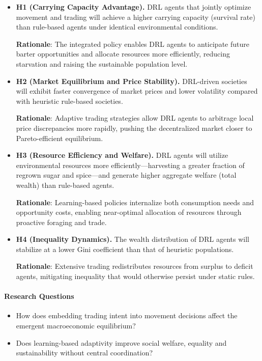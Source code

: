 \documentclass[pdflatex,sn-mathphys-num]{sn-jnl}%
\theoremstyle{thmstyleone}%
\theoremstyle{thmstyletwo}%
\theoremstyle{thmstylethree}%
\begin{document}
\begin{itemize}
\item \textbf{H1 (Carrying Capacity Advantage).} DRL agents that jointly optimize movement and trading will achieve a higher carrying capacity (survival rate) than rule-based agents under identical environmental conditions.

\textbf{Rationale}: The integrated policy enables DRL agents to anticipate future barter opportunities and allocate resources more efficiently, reducing starvation and raising the sustainable population level.

\item \textbf{H2 (Market Equilibrium and Price Stability).} DRL-driven societies will exhibit faster convergence of market prices and lower volatility compared with heuristic rule-based societies.

\textbf{Rationale}: Adaptive trading strategies allow DRL agents to arbitrage local price discrepancies more rapidly, pushing the decentralized market closer to Pareto-efficient equilibrium.

\item \textbf{H3 (Resource Efficiency and Welfare).} DRL agents will utilize environmental resources more efficiently—harvesting a greater fraction of regrown sugar and spice—and generate higher aggregate welfare (total wealth) than rule-based agents.

\textbf{Rationale}: Learning-based policies internalize both consumption needs and opportunity costs, enabling near-optimal allocation of resources through proactive foraging and trade.

\item \textbf{H4 (Inequality Dynamics).} The wealth distribution of DRL agents will stabilize at a lower Gini coefficient than that of heuristic populations.

\textbf{Rationale}: Extensive trading redistributes resources from surplus to deficit agents, mitigating inequality that would otherwise persist under static rules.

\end{itemize}

\paragraph{Research Questions}

\begin{itemize}
    \item[(i)] How does embedding trading intent into movement decisions affect the emergent macroeconomic equilibrium?
    \item[(ii)] Does learning-based adaptivity improve social welfare, equality and sustainability without central coordination?
\end{itemize}
\end{document}
